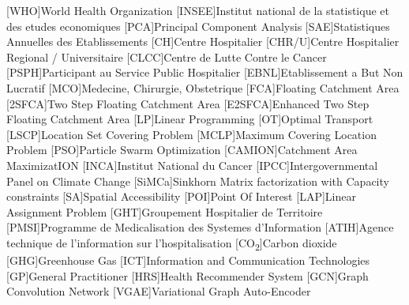\begin{multicols}{2}

        \begin{acronym}
                [WHO]{World Health Organization}
                [INSEE]{Institut national de la statistique et des etudes economiques}
                [PCA]{Principal Component Analysis}
                [SAE]{Statistiques Annuelles des Etablissements}
                [CH]{Centre Hospitalier}
                [CHR/U]{Centre Hospitalier Regional / Universitaire}
                [CLCC]{Centre de Lutte Contre le Cancer}
                [PSPH]{Participant au Service Public Hospitalier }
                [EBNL]{Etablissement a But Non Lucratif}
                [MCO]{Medecine, Chirurgie, Obstetrique}
                [FCA]{Floating Catchment Area}
                [2SFCA]{Two Step Floating Catchment Area}
                [E2SFCA]{Enhanced Two Step Floating Catchment Area}
                [LP]{Linear Programming}
                [OT]{Optimal Transport}
                [LSCP]{Location Set Covering Problem}
                [MCLP]{Maximum Covering Location Problem}
                [PSO]{Particle Swarm Optimization}
                [CAMION]{Catchment Area MaximizatION}
                [INCA]{Institut National du Cancer}
                [IPCC]{Intergovernmental Panel on Climate Change}
                [SiMCa]{Sinkhorn Matrix factorization with Capacity constraints}
                [SA]{Spatial Accessibility}
                [POI]{Point Of Interest}
                [LAP]{Linear Assignment Problem}
                [GHT]{Groupement Hospitalier de Territoire}
                [PMSI]{Programme de Medicalisation des Systemes d'Information}
                [ATIH]{Agence technique de l'information sur l'hospitalisation}
                [CO\textsubscript{2}]{Carbon dioxide}
                [GHG]{Greenhouse Gas}
                [ICT]{Information and Communication Technologies}
                [GP]{General Practitioner}
                [HRS]{Health Recommender System}
                [GCN]{Graph Convolution Network}
                [VGAE]{Variational Graph Auto-Encoder}
        \end{acronym}

\end{multicols}

